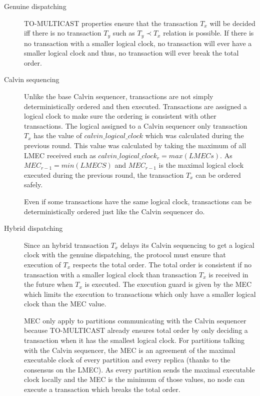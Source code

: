 \documentclass[a4paper, 10pt]{article}
\begin{document}
\begin{description}
    \item[Genuine dispatching] TO-MULTICAST properties ensure that the transaction $T_x$ will be decided
        iff there is no transaction $T_y$ such as $T_y \prec T_x$ relation is possible. If there is no
        transaction with a smaller logical clock, no transaction will ever have a smaller
        logical clock and thus, no transaction will ever break the total order.

    \item[Calvin sequencing] Unlike the base Calvin sequencer, transactions are not simply deterministically
        ordered and then executed. Transactions are assigned a logical clock to make sure the ordering is
        consistent with other transactions. The logical assigned to a Calvin sequencer only transaction $T_x$
        has the value of $calvin\_logical\_clock$ which was calculated during the previous round. This value was
        calculated by taking the maximum of all LMEC received such as $calvin\_logical\_clock_{r}=max(LMECs)$.
        As $MEC_{r-1} = min(LMECS)$ and $MEC_{r-1}$ is the maximal logical clock executed during the previous round,
        the transaction $T_x$ can be ordered safely.

        Even if some transactions have the same logical clock, transactions can be deterministically
        ordered just like the Calvin sequencer do.

    \item[Hybrid dispatching] Since an hybrid transaction $T_x$ delays its Calvin sequencing to get a
        logical clock with the genuine dispatching, the protocol must ensure that execution of $T_x$
        respects the total order. The total order is consistent if no transaction with a smaller logical clock
        than transaction $T_x$ is received in the future when $T_x$ is executed.
        The execution guard is given by the MEC which limits the execution
        to transactions which only have a smaller logical clock than the MEC value.

        MEC only apply to partitions communicating with the Calvin sequencer because TO-MULTICAST already ensures
        total order by only deciding a transaction when it has the smallest logical clock. For partitions talking with the Calvin
        sequencer, the MEC is an agreement of the maximal executable clock of every partition and every replica
        (thanks to the consensus on the LMEC). As every partition sends the maximal executable clock locally and
        the MEC is the minimum of those values, no node can execute a transaction which breaks the total order.
\end{description}
\end{document}
